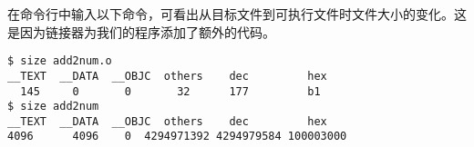 \begin{frame}[fragile]\ft{\secname}
在命令行中输入以下命令，可看出从目标文件到可执行文件时文件大小的变化。这是因为链接器为我们的程序添加了额外的代码。
\begin{lstlisting}[basicstyle=\ttfamily\footnotesize,backgroundcolor=\color{red!10}]
$ size add2num.o
__TEXT  __DATA  __OBJC  others    dec         hex
  145     0       0       32      177         b1        
$ size add2num
__TEXT  __DATA  __OBJC  others    dec         hex
4096      4096    0  4294971392 4294979584 100003000
\end{lstlisting}

\end{frame}
